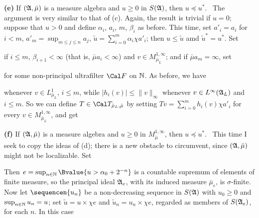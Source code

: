 {\medskip
     
{\bf (e)} If $(\frak A,\bar\mu)$ is a measure algebra and $u\ge 0$ in
$S(\frak A)$, then $u\preccurlyeq u^*$.   \Prf\ The argument is very
similar to that of (c).   Again, the result is trivial if $u=0$;
suppose that $u>0$ and define $\alpha_i$, $a_i$, $m$, $\beta_i$ as
before.   This time, set $a'_i=a_i$ for $i<m$, $a'_m=\sup_{m\le j\le
n}a_j$, $\tilde u=\sum_{i=0}^m\alpha_i\chi a'_i$;  then $u\le\tilde u$
amd
$\tilde u^*=u^*$.   Set
     
     
\noindent if $i\le m$, $\beta_{i+1}<\infty$ (that is, $\bar\mu
a_i<\infty$) and $v\in M^{1,\infty}_{\bar\mu_L}$;  and if
$\bar\mu a_m=\infty$, set
     
     
\noindent for some non-principal ultrafilter $\Cal F$ on $\Bbb N$.   As
before, we have
     
     
\noindent whenever $v\in L^1_{\bar\mu_L}$, $i\le m$, while
$|h_i(v)|\le\|v\|_{\infty}$ whenever $v\in L^{\infty}(\frak A_L)$ and
$i\le m$.   So we can define $T\in\Cal T_{\bar\mu_L,\bar\mu}$ by setting
$Tv=\sum_{i=0}^mh_i(v)\chi a'_i$ for every $v\in
M^{1,\infty}_{\bar\mu_L}$, and get
     
     
\medskip
     
{\bf (f)} If $(\frak A,\bar\mu)$ is a measure algebra and $u\ge 0$ in
$M^{1,\infty}_{\bar\mu}$, then $u\preccurlyeq u^*$.   \Prf\ This time I
seek to copy the ideas of (d);  there is a new obstacle to circumvent,
since $(\frak A,\bar\mu)$ might not be localizable.   Set
     
     
\noindent Then $e=\sup_{n\in\Bbb N}\Bvalue{u>\alpha_0+2^{-n}}$ is a
countable supremum of elements of finite measure, so the principal ideal
$\frak A_e$, with its induced measure $\bar\mu_e$, is $\sigma$-finite.
Now let $\sequencen{u_n}$ be a non-decreasing sequence in $S(\frak A)$
with $u_0\ge 0$ and $\sup_{n\in\Bbb N}u_n=u$;  set $\tilde u=u\times\chi
e$ and $\tilde u_n=u_n\times\chi e$, regarded as members of $S(\frak
A_e)$, for each $n$.   In this case
     
}

